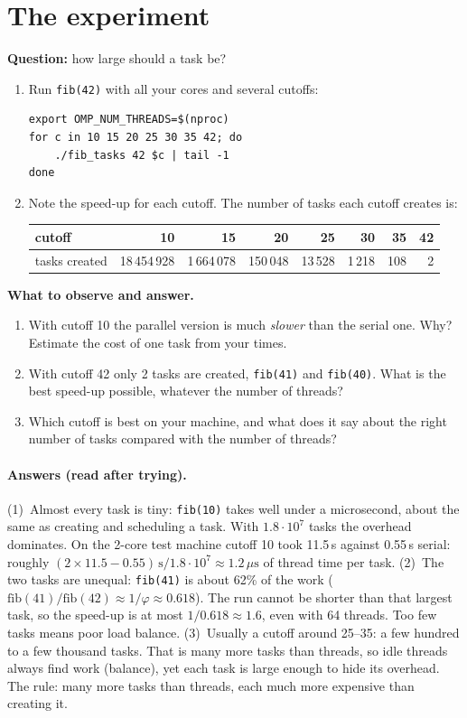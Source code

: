 \documentclass[11pt,a4paper]{article}
\let\origtexttt\texttt
\renewcommand{\texttt}[1]{\textcolor{black!60}{\origtexttt{#1}}}
\begin{document}
\section{The experiment}
\begin{experiment}
\textbf{Question:} how large should a task be?
\begin{enumerate}
  \item Run \texttt{fib(42)} with all your cores and several cutoffs:
\begin{lstlisting}[style=sh]
export OMP_NUM_THREADS=$(nproc)
for c in 10 15 20 25 30 35 42; do
    ./fib_tasks 42 $c | tail -1
done
\end{lstlisting}
  \item Note the speed-up for each cutoff. The number of tasks each cutoff creates is:
\begin{center}
\small
\begin{tabular}{@{}lrrrrrrr@{}}
\toprule
cutoff & 10 & 15 & 20 & 25 & 30 & 35 & 42 \\ \midrule
tasks created & 18\,454\,928 & 1\,664\,078 & 150\,048 & 13\,528 & 1\,218 & 108 & 2 \\
\bottomrule
\end{tabular}
\end{center}
\end{enumerate}
\textbf{What to observe and answer.}
\begin{enumerate}
  \item With cutoff 10 the parallel version is much \emph{slower} than the serial one. Why?
        Estimate the cost of one task from your times.
  \item With cutoff 42 only 2 tasks are created, \texttt{fib(41)} and \texttt{fib(40)}. What
        is the best speed-up possible, whatever the number of threads?
  \item Which cutoff is best on your machine, and what does it say about the right number of
        tasks compared with the number of threads?
\end{enumerate}
\end{experiment}

\paragraph{Answers (read after trying).}
(1)~Almost every task is tiny: \texttt{fib(10)} takes well under a microsecond, about the
same as creating and scheduling a task. With $1.8\cdot10^7$ tasks the overhead dominates. On
the 2-core test machine cutoff 10 took 11.5\,s against 0.55\,s serial: roughly
$(2\times11.5 - 0.55)\,\text{s} / 1.8\cdot10^7 \approx 1.2\,\mu\text{s}$ of thread time per
task.
(2)~The two tasks are unequal: \texttt{fib(41)} is about 62\% of the work
($\text{fib}(41)/\text{fib}(42) \approx 1/\varphi \approx 0.618$). The run cannot be shorter
than that largest task, so the speed-up is at most $1/0.618 \approx 1.6$, even with 64
threads. Too few tasks means poor load balance.
(3)~Usually a cutoff around 25--35: a few hundred to a few thousand tasks. That is many more
tasks than threads, so idle threads always find work (balance), yet each task is large
enough to hide its overhead. The rule: many more tasks than threads, each much more
expensive than creating it.
\end{document}
